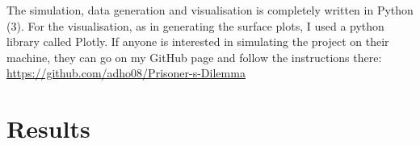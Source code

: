 \documentclass{article}
\begin{document}
The simulation, data generation and visualisation is completely written in Python (3).
For the visualisation, as in generating the surface plots, I used a python library called Plotly.
If anyone is interested in simulating the project on their machine, they can go on my GitHub page and follow the instructions there:
\href{https://github.com/adho08/Prisoner-s-Dilemma}{https://github.com/adho08/Prisoner-s-Dilemma}

	


\section{Results}
\end{document}
